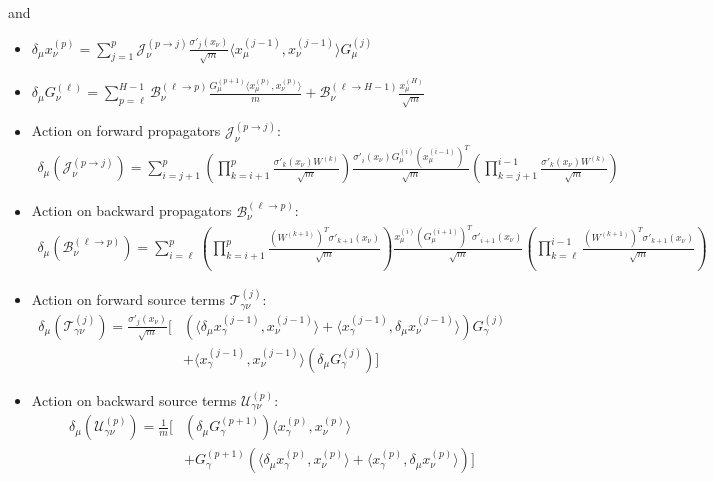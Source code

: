 \documentclass[11pt,a4paper]{article}
\theoremstyle{definition}
\begin{document}
and
\begin{itemize}
    \item $\delta_\mu x^{(p)}_\nu = \sum_{j=1}^{p} \mathcal{J}^{(p \to j)}_{\nu} \frac{\sigma'_{j}(x_\nu)}{\sqrt{m}} \langle x^{(j-1)}_\mu, x^{(j-1)}_\nu \rangle G^{(j)}_\mu$
    \item $\delta_\mu G^{(\ell)}_\nu = \sum_{p=\ell}^{H-1} \mathcal{B}^{(\ell \to p)}_{\nu} \frac{G^{(p+1)}_\mu \langle x^{(p)}_\mu, x^{(p)}_\nu \rangle}{m} + \mathcal{B}^{(\ell \to H-1)}_{\nu} \frac{x^{(H)}_\mu}{\sqrt{m}}$
    \item Action on forward propagators $\mathcal{J}^{(p \to j)}_{\nu}$:
    \begin{align}
        \delta_\mu(\mathcal{J}^{(p \to j)}_{\nu}) = \sum_{i=j+1}^{p} \left( \prod_{k=i+1}^{p} \frac{\sigma'_{k}(x_\nu) W^{(k)}}{\sqrt{m}} \right) \frac{\sigma'_{i}(x_\nu) G^{(i)}_\mu (x^{(i-1)}_\mu)^T}{\sqrt{m}} \left( \prod_{k=j+1}^{i-1} \frac{\sigma'_{k}(x_\nu) W^{(k)}}{\sqrt{m}} \right)
    \end{align}
    \item Action on backward propagators $\mathcal{B}^{(\ell \to p)}_{\nu}$:
    \begin{align}
        \delta_\mu(\mathcal{B}^{(\ell \to p)}_{\nu}) = \sum_{i=\ell}^{p} \left( \prod_{k=i+1}^{p} \frac{(W^{(k+1)})^T \sigma'_{k+1}(x_\nu)}{\sqrt{m}} \right) \frac{x^{(i)}_\mu (G^{(i+1)}_\mu)^T \sigma'_{i+1}(x_\nu)}{\sqrt{m}} \left( \prod_{k=\ell}^{i-1} \frac{(W^{(k+1)})^T \sigma'_{k+1}(x_\nu)}{\sqrt{m}} \right)
    \end{align}
    \item Action on forward source terms $\mathcal{T}^{(j)}_{\gamma\nu}$:
    \begin{align}
        \delta_\mu(\mathcal{T}^{(j)}_{\gamma\nu}) = \frac{\sigma'_{j}(x_\nu)}{\sqrt{m}} \Biggl[ & \left( \langle \delta_\mu x^{(j-1)}_\gamma, x^{(j-1)}_\nu \rangle + \langle x^{(j-1)}_\gamma, \delta_\mu x^{(j-1)}_\nu \rangle \right) G^{(j)}_\gamma \nonumber \\
        & + \langle x^{(j-1)}_\gamma, x^{(j-1)}_\nu \rangle (\delta_\mu G^{(j)}_\gamma) \Biggr]
    \end{align}
    \item Action on backward source terms $\mathcal{U}^{(p)}_{\gamma\nu}$:
    \begin{align}
        \delta_\mu(\mathcal{U}^{(p)}_{\gamma\nu}) = \frac{1}{m} \Biggl[ & (\delta_\mu G^{(p+1)}_\gamma) \langle x^{(p)}_\gamma, x^{(p)}_\nu \rangle \nonumber \\
        & + G^{(p+1)}_\gamma \left( \langle \delta_\mu x^{(p)}_\gamma, x^{(p)}_\nu \rangle + \langle x^{(p)}_\gamma, \delta_\mu x^{(p)}_\nu \rangle \right) \Biggr]
    \end{align}
\end{itemize}
\end{document}
